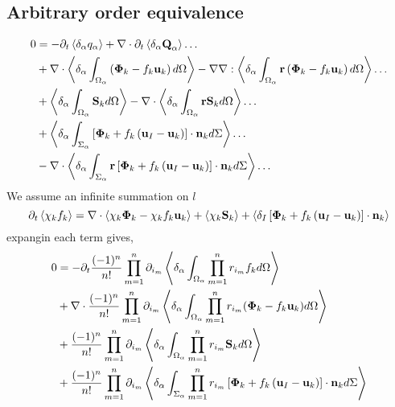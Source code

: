 \subsection*{Arbitrary order equivalence}
\begin{align}    
    0 &= 
    - \partial_t \left<\delta_\alpha q_\alpha\right> +  \mathbf{\nabla} \cdot  \partial_t\left<\delta_\alpha \textbf{Q}_\alpha\right> \ldots \nonumber\\
    &+ \mathbf{\nabla} \cdot \left<\delta_\alpha \int_{\Omega_\alpha}\left(\mathbf{\Phi}_k - f_k \textbf{u}_k \right)d\Omega\right>
    -\mathbf{\nabla}\mathbf{\nabla} : \left<\delta_\alpha \int_{\Omega_\alpha}\textbf{r}\left(\mathbf{\Phi}_k - f_k \textbf{u}_k \right)d\Omega\right>
    \ldots\nonumber\\
    &+ \left<\delta_\alpha  \int_{\Omega_\alpha} \textbf{S}_k d\Omega\right>
    - \mathbf{\nabla} \cdot \left<\delta_\alpha  \int_{\Omega_\alpha} \textbf{r}\textbf{S}_k d\Omega\right>
    \ldots\nonumber\\
    &+ \left<\delta_\alpha \int_{\Sigma_\alpha}\left[
        \mathbf{\Phi}_k
        + f_k
        \left(
            \textbf{u}_I
            - \textbf{u}_k
        \right)
    \right]
    \cdot \textbf{n}_kd\Sigma\right> \ldots\nonumber\\
    &-  \mathbf{\nabla} \cdot \left<\delta_\alpha \int_{\Sigma_\alpha} \textbf{r}\left[
        \mathbf{\Phi}_k
        + f_k
        \left(
            \textbf{u}_I
            - \textbf{u}_k
        \right)
    \right]
    \cdot \textbf{n}_kd\Sigma\right> \ldots
\end{align}
We assume an infinite summation on $l$
\begin{equation}
        \partial_t \left<\chi_k f_k\right>
        = \mathbf{\nabla} \cdot \left<\chi_k \mathbf{\Phi}_k - \chi_k f_k \textbf{u}_k\right>
        + \left<\chi_k \textbf{S}_k\right>
        + \left<\delta_I\left[
            \mathbf{\Phi}_k
            + f_k
            \left(
                \textbf{u}_I
                - \textbf{u}_k
            \right)
        \right]
        \cdot \textbf{n}_k\right> 
\end{equation}
expangin each term gives,
\begin{align}
        0 &=
        - \partial_t \frac{(-1)^n}{n!} \prod_{m=1}^{n} \partial_{i_m} \left<\delta_\alpha \int_{\Omega_\alpha} \prod_{m=1}^{n} r_{i_m}f_k d\Omega\right> \\
        &+\mathbf{\nabla} \cdot \frac{(-1)^n}{n!} \prod_{m=1}^{n} \partial_{i_m} \left<\delta_\alpha \int_{\Omega_\alpha} \prod_{m=1}^{n} r_{i_m}(\mathbf{\Phi}_k - f_k \textbf{u}_k) d\Omega\right>\\
        &+ \frac{(-1)^n}{n!} \prod_{m=1}^{n} \partial_{i_m} \left<\delta_\alpha \int_{\Omega_\alpha} \prod_{m=1}^{n} r_{i_m} \textbf{S}_k d\Omega\right>\\
        &+ \frac{(-1)^n}{n!} \prod_{m=1}^{n} \partial_{i_m} \left<\delta_\alpha \int_{\Sigma_\alpha} \prod_{m=1}^{n} r_{i_m}\left[
            \mathbf{\Phi}_k
            + f_k
            \left(
                \textbf{u}_I
                - \textbf{u}_k
            \right)
        \right]
        \cdot \textbf{n}_k d\Sigma\right> \\
\end{align}
